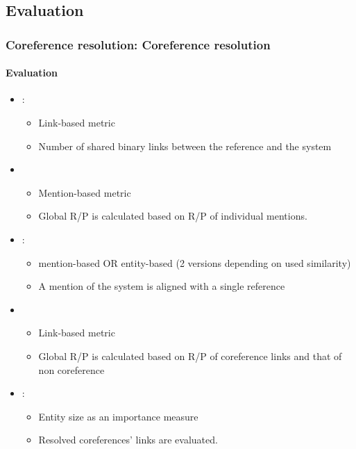 \documentclass[xcolor=table]{beamer}
\begin{document}
\subsection{Evaluation}

\begin{frame}
	\frametitle{Coreference resolution: Coreference resolution}
	\framesubtitle{Evaluation}
	
	\begin{itemize}
		\item {}: 
		\begin{itemize}
			\item Link-based metric
			\item Number of shared binary links between the reference and the system
		\end{itemize}
		\item {}
		\begin{itemize}
			\item Mention-based metric
			\item Global R/P is calculated based on R/P of individual mentions.
		\end{itemize}
		\item {}: 
		\begin{itemize}
			\item mention-based OR entity-based (2 versions depending on used similarity)
			\item A mention of the system is aligned with a single reference
		\end{itemize}
		\item {} 
		\begin{itemize}
			\item Link-based metric
			\item Global R/P is calculated based on R/P of coreference links and that of non coreference
		\end{itemize}
		\item {}: 
		\begin{itemize}
			\item Entity size as an importance measure
			\item Resolved coreferences' links are evaluated.
		\end{itemize}
	\end{itemize}
	
\end{frame}
\end{document}
